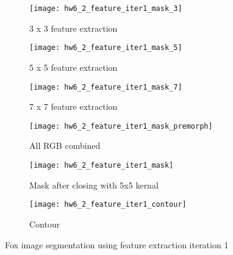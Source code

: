 \documentclass[11pt]{article}
\begin{document}
\begin{figure}[H]
\begin{subfigure}{.5\textwidth}
  \centering
  \texttt{[image: hw6\_2\_feature\_iter1\_mask\_3]}
  \caption{3 x 3 feature extraction}
  \label{}
\end{subfigure}
\begin{subfigure}{.5\textwidth}
  \centering
  \texttt{[image: hw6\_2\_feature\_iter1\_mask\_5]}
  \caption{5 x 5 feature extraction}
  \label{}
\end{subfigure}

\begin{subfigure}{.5\textwidth}
  \centering
  \texttt{[image: hw6\_2\_feature\_iter1\_mask\_7]}
  \caption{7 x 7 feature extraction}
  \label{}
\end{subfigure}
\begin{subfigure}{.5\textwidth}
  \centering
  \texttt{[image: hw6\_2\_feature\_iter1\_mask\_premorph]}
  \caption{All RGB combined}
  \label{}
\end{subfigure}

\begin{subfigure}{.5\textwidth}
  \centering
  \texttt{[image: hw6\_2\_feature\_iter1\_mask]}
  \caption{Mask after closing with 5x5 kernal}
  \label{}
\end{subfigure}
\begin{subfigure}{.5\textwidth}
  \centering
  \texttt{[image: hw6\_2\_feature\_iter1\_contour]}
  \caption{Contour}
  \label{}
\end{subfigure}

\caption{Fox image segmentation using feature extraction iteration 1}
\label{}
\end{figure}
\end{document}
